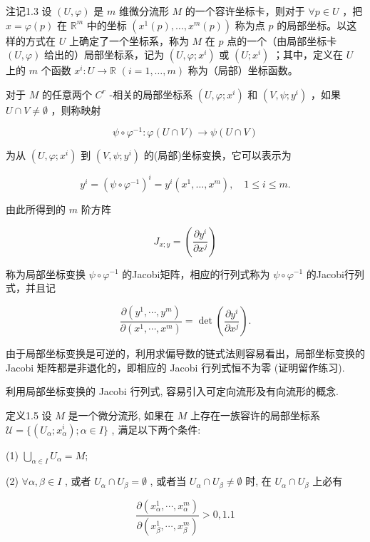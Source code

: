 注记1.3 设  $(U, \varphi)$  是  $m$  维微分流形  $M$  的一个容许坐标卡，则对于  $\forall p \in U$ ，把  $x = \varphi(p)$  在  $\mathbb{R}^m$  中的坐标  $(x^1(p), \dots, x^m(p))$  称为点  $p$  的局部坐标。以这样的方式在  $U$  上确定了一个坐标系，称为  $M$  在  $p$  点的一个（由局部坐标卡  $(U, \varphi)$  给出的）局部坐标系，记为  $(U, \varphi; x^i)$  或  $(U; x^i)$ ；其中，定义在  $U$  上的  $m$  个函数  $x^i: U \to \mathbb{R}$ $(i = 1, \dots, m)$  称为（局部）坐标函数。

对于  $M$  的任意两个  $C^r$ -相关的局部坐标系  $(U, \varphi; x^i)$  和  $(V, \psi; y^i)$ ，如果  $U \cap V \neq \emptyset$ ，则称映射

$$
\psi \circ \varphi^ {- 1}: \varphi (U \cap V) \rightarrow \psi (U \cap V)
$$

为从  $(U,\varphi ;x^i)$  到  $(V,\psi ;y^{i})$  的(局部)坐标变换，它可以表示为

$$
y ^ {i} = (\psi \circ \varphi^ {- 1}) ^ {i} = y ^ {i} (x ^ {1}, \dots , x ^ {m}), \quad 1 \leqslant i \leqslant m.
$$

由此所得到的  $m$  阶方阵

$$
J _ {x; y} = \left(\frac {\partial y ^ {i}}{\partial x ^ {j}}\right)
$$

称为局部坐标变换  $\psi \circ \varphi^{-1}$  的Jacobi矩阵，相应的行列式称为  $\psi \circ \varphi^{-1}$  的Jacobi行列式，并且记

$$
\frac {\partial \left(y ^ {1} , \cdots , y ^ {m}\right)}{\partial \left(x ^ {1} , \cdots , x ^ {m}\right)} = \det  \left(\frac {\partial y ^ {i}}{\partial x ^ {j}}\right).
$$

由于局部坐标变换是可逆的，利用求偏导数的链式法则容易看出，局部坐标变换的 Jacobi 矩阵都是非退化的，即相应的 Jacobi 行列式恒不为零 (证明留作练习).

利用局部坐标变换的 Jacobi 行列式, 容易引入可定向流形及有向流形的概念.

定义1.5 设  $M$  是一个微分流形, 如果在  $M$  上存在一族容许的局部坐标系  $\mathcal{U} = \{(U_{\alpha}; x_{\alpha}^{i}); \alpha \in I\}$ , 满足以下两个条件:

(1)  $\bigcup_{\alpha \in I} U_{\alpha} = M;$

(2)  $\forall \alpha, \beta \in I$ , 或者  $U_{\alpha} \cap U_{\beta} = \emptyset$ , 或者当  $U_{\alpha} \cap U_{\beta} \neq \emptyset$  时, 在  $U_{\alpha} \cap U_{\beta}$  上必有

$$
\frac {\partial \left(x _ {\alpha} ^ {1} , \cdots , x _ {\alpha} ^ {m}\right)}{\partial \left(x _ {\beta} ^ {1} , \cdots , x _ {\beta} ^ {m}\right)} > 0, %
 {1.1}
$$

